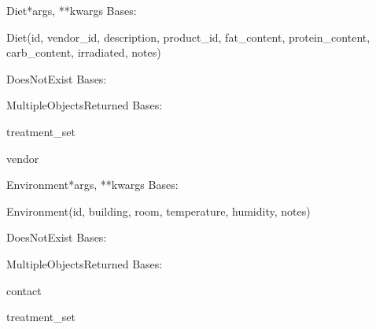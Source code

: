 \documentclass[letterpaper,10pt,english]{sphinxmanual}
\begin{document}
\hypertarget{data.models.Diet}{}\begin{classdesc}{Diet}{*args, **kwargs}
Bases: 

Diet(id, vendor\_id, description, product\_id, fat\_content, protein\_content, carb\_content, irradiated, notes)

\hypertarget{data.models.Diet.DoesNotExist}{}\begin{excdesc}{DoesNotExist}
Bases: 
\end{excdesc}

\hypertarget{data.models.Diet.MultipleObjectsReturned}{}\begin{excdesc}{MultipleObjectsReturned}
Bases: 
\end{excdesc}

\hypertarget{data.models.Diet.treatment\_set}{}\begin{memberdesc}[Diet]{treatment\_set}\end{memberdesc}

\hypertarget{data.models.Diet.vendor}{}\begin{memberdesc}[Diet]{vendor}\end{memberdesc}
\end{classdesc}

\hypertarget{data.models.Environment}{}\begin{classdesc}{Environment}{*args, **kwargs}
Bases: 

Environment(id, building, room, temperature, humidity, notes)

\hypertarget{data.models.Environment.DoesNotExist}{}\begin{excdesc}{DoesNotExist}
Bases: 
\end{excdesc}

\hypertarget{data.models.Environment.MultipleObjectsReturned}{}\begin{excdesc}{MultipleObjectsReturned}
Bases: 
\end{excdesc}

\hypertarget{data.models.Environment.contact}{}\begin{memberdesc}[Environment]{contact}\end{memberdesc}

\hypertarget{data.models.Environment.treatment\_set}{}\begin{memberdesc}[Environment]{treatment\_set}\end{memberdesc}
\end{classdesc}
\end{document}
